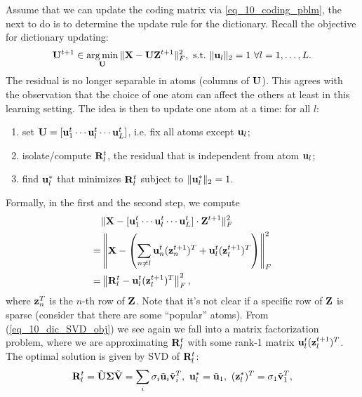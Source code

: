 \documentclass[../book-template.tex]{subfiles}
\begin{document}
\par Assume that we can update the coding matrix via \ref{eq_10_coding_pblm}, the next to do is to determine the update rule for the dictionary. Recall the objective for dictionary updating:
\begin{equation*}
	{\bf U}^{t+1}\in \mathop{\arg\min}_{\bf U} \|{\bf X}-{\bf U}{\bf Z}^{t+1}\|_F^2,\ {\rm s.t. }\ \|{\bf u}_l\|_2=1\ \forall l=1,\dots,L.
\end{equation*}
The residual is no longer separable in atoms (columns of ${\bf U}$). This agrees with the observation that the choice of one atom can affect the others at least in this learning setting. The idea is then to update one atom at a time: for all $l$:
\begin{enumerate}
	\item set ${\bf U}=[{\bf u}_1^t\cdots {\bf u}_l^t\cdots {\bf u}_L^t]$, i.e. fix all atoms except ${\bf u}_l$;
	\item isolate/compute ${\bf R}_l^t$, the residual that is independent from atom ${\bf u}_l$;
	\item find ${\bf u}_l^*$ that minimizes ${\bf R}_l^t$ subject to $\|{\bf u}_l^*\|_2=1$.
\end{enumerate}
Formally, in the first and the second step, we compute
\begin{align}
	&\|{\bf X}-[{\bf u}_1^t\cdots {\bf u}_l^t\cdots {\bf u}_L^t]\cdot {\bf Z}^{t+1}\|_F^2\notag\\
	=&\left\|{\bf X}-\left(\sum_{n\neq l}{\bf u}_n^t({\bf z}_n^{t+1})^T + {\bf u}_l^t({\bf z}_l^{t+1})^T\right)\right\|_F^2\notag\\
	\label{eq_10_dic_SVD_obj}=&\left\|{\bf R}_l^t-{\bf u}_l^t({\bf z}_l^{t+1})^T\right\|_F^2,
\end{align}
where ${\bf z}_n^T$ is the $n$-th row of ${\bf Z}$. Note that it's not clear if a specific row of ${\bf Z}$ is sparse (consider that there are some ``popular'' atoms). From (\ref{eq_10_dic_SVD_obj}) we see again we fall into a matrix factorization problem, where we are approximating ${\bf R}_l^t$ with some rank-1 matrix ${\bf u}_l^t({\bf z}_l^{t+1})^T$. The optimal solution is given by SVD of ${\bf R}_l^t$:
\begin{equation*}
	{\bf R}_l^t=\tilde{\bf U}{\bf \Sigma}\tilde{\bf V}=\sum_i \sigma_i \tilde{\bf u}_i\tilde{\bf v}_i^T,\ {\bf u}_l^*=\tilde{\bf u}_1,\ ({\bf z}_l^{*})^T = \sigma_1\tilde{\bf v}_1^T,
\end{equation*}
\end{document}
